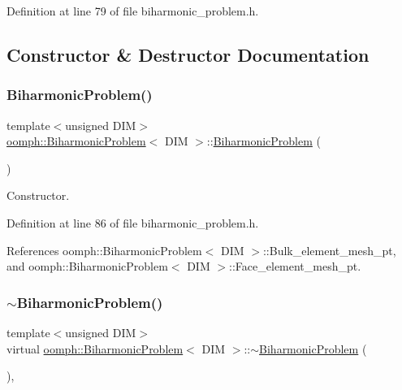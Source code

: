Definition at line 79 of file biharmonic\+\_\+problem.\+h.



\subsection{Constructor \& Destructor Documentation}
\mbox{\label{classoomph_1_1BiharmonicProblem_aa7f9273c26bd98238edb58363db9a02e}} 
\subsubsection{\texorpdfstring{Biharmonic\+Problem()}{BiharmonicProblem()}}
{\footnotesize\ttfamily template$<$unsigned D\+IM$>$ \\
\hyperlink{classoomph_1_1BiharmonicProblem}{oomph\+::\+Biharmonic\+Problem}$<$ D\+IM $>$\+::\hyperlink{classoomph_1_1BiharmonicProblem}{Biharmonic\+Problem} (\begin{DoxyParamCaption}{ }\end{DoxyParamCaption})\hspace{0.3cm}{\ttfamily [inline]}}



Constructor. 



Definition at line 86 of file biharmonic\+\_\+problem.\+h.



References oomph\+::\+Biharmonic\+Problem$<$ D\+I\+M $>$\+::\+Bulk\+\_\+element\+\_\+mesh\+\_\+pt, and oomph\+::\+Biharmonic\+Problem$<$ D\+I\+M $>$\+::\+Face\+\_\+element\+\_\+mesh\+\_\+pt.

\mbox{\label{classoomph_1_1BiharmonicProblem_aa8a0fd0fdaa257149f4f513d383d9178}} 
\subsubsection{\texorpdfstring{$\sim$\+Biharmonic\+Problem()}{~BiharmonicProblem()}}
{\footnotesize\ttfamily template$<$unsigned D\+IM$>$ \\
virtual \hyperlink{classoomph_1_1BiharmonicProblem}{oomph\+::\+Biharmonic\+Problem}$<$ D\+IM $>$\+::$\sim$\hyperlink{classoomph_1_1BiharmonicProblem}{Biharmonic\+Problem} (\begin{DoxyParamCaption}{ }\end{DoxyParamCaption})\hspace{0.3cm}{\ttfamily [inline]}, {\ttfamily [virtual]}}




